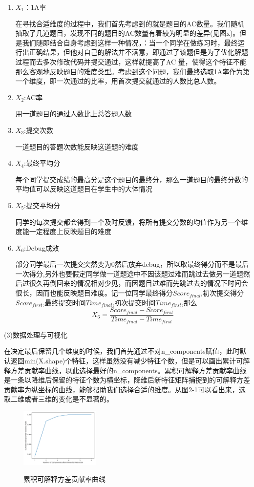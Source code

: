 \documentclass[UTF8]{ctexart}
\begin{document}
	\begin{enumerate}
		\item $X_1$：1A率
		\par 在寻找合适维度的过程中，我们首先考虑到的就是题目的AC数量。我们随机抽取了几道题目，发现不同的题目的AC数量有着较为明显的差异(见图x)。但是我们随即结合自身考虑到这样一种情况，：当一个同学在做练习时，最终运行出正确结果，但他对自己的解法并不满意，即通过了该题但是为了优化解题过程而去多次修改代码并提交通过，这样就提高了AC 量，使得这个特征不能那么客观地反映题目的难度类型。考虑到这个问题，我们最终选取1A率作为第一个维度，即一次通过的比率，用首次提交就通过的人数比总人数。
		\item $X_2$:AC率
		\par 用一道题目的通过人数比上总答题人数
		\item $X_3$:提交次数
		\par 一道题目的答题次数能反映这道题的难度
		\item $X_4$:最终平均分
		\par 每个同学提交成绩的最高分是这个题目的最终分，那么一道题目的最终分数的平均值可以反映这道题目在学生中的大体情况
		\item $X_5$:提交平均分
		\par 同学的每次提交都会得到一个及时反馈，将所有提交分数的均值作为另一个维度能一定程度上反映题目的难度
		\item $X_6$:Debug成效
		\par 部分同学最后一次提交突然变为0然后放弃debug，所以取最终得分而不是最后一次得分,另外也要假定同学做一道题途中不因该题过难而跳过去做另一道题然后过很久再倒回来的情况相对少见，而因题目过难而先跳过去的情况下时间会很长，因而也能反映题目难度。记一位同学最终得分$Score_{final}$,初次提交得分$Score_{first}$,最终提交时间$Time_{final}$,初次提交时间$Time_{first}$,那么
		$$X_6=\frac{Score_{final}-Score_{first}}{Time_{final}-Time_{first}}$$
	\end{enumerate}
	\par (3)数据处理与可视化
	\par 在决定最后保留几个维度的时候，我们首先通过不对n\_components赋值，此时默认返回min(X.shape)个特征，这样虽然没有减少特征个数，但是可以画出累计可解释方差贡献率曲线，以此选择最好的n\_components。累积可解释方差贡献率曲线是一条以降维后保留的特征个数为横坐标，降维后新特征矩阵捕捉到的可解释方差贡献率为纵坐标的曲线，能够帮助我们选择合适的维度。从图2-1可以看出来，选取二维或者三维的变化是不显著的。
	\begin{figure}[!htbp]
		\centering
		\includegraphics[width=0.35\textwidth]{Figure_2.png}\\
		\caption{累积可解释方差贡献率曲线}
	\end{figure}
\end{document}
